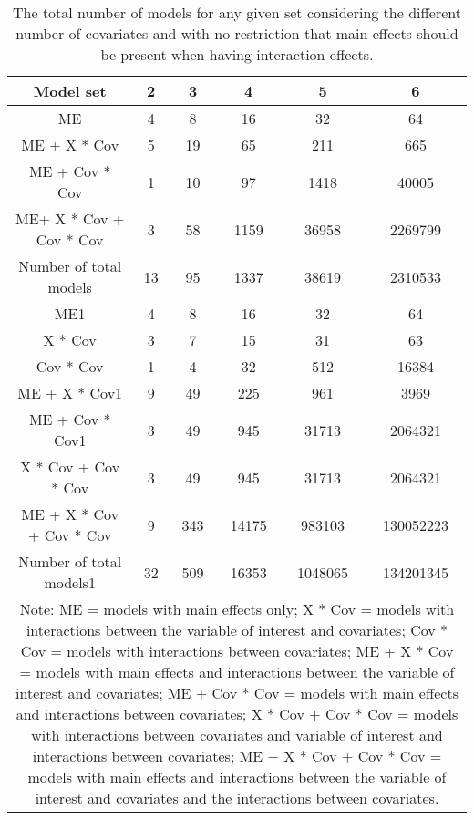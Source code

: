 \begin{table}[!h]
\centering
\caption{The total number of models for any given set considering the different number of covariates and with no restriction that main effects should be present when having interaction effects.} 
\begin{tabular}{cccccc}
  \hline
Model set & 2 & 3 & 4 & 5 & 6 \\ 
  \hline
ME & 4 & 8 & 16 & 32 & 64 \\ 
  ME + X * Cov & 5 & 19 & 65 & 211 & 665 \\ 
  ME + Cov * Cov & 1 & 10 & 97 & 1418 & 40005 \\ 
  ME+ X * Cov + Cov * Cov & 3 & 58 & 1159 & 36958 & 2269799 \\ 
  Number of total models & 13 & 95 & 1337 & 38619 & 2310533 \\ 
  ME1 & 4 & 8 & 16 & 32 & 64 \\ 
  X * Cov & 3 & 7 & 15 & 31 & 63 \\ 
  Cov * Cov & 1 & 4 & 32 & 512 & 16384 \\ 
  ME + X * Cov1 & 9 & 49 & 225 & 961 & 3969 \\ 
  ME + Cov * Cov1 & 3 & 49 & 945 & 31713 & 2064321 \\ 
  X * Cov + Cov * Cov & 3 & 49 & 945 & 31713 & 2064321 \\ 
  ME + X * Cov + Cov * Cov & 9 & 343 & 14175 & 983103 & 130052223 \\ 
  Number of total models1 & 32 & 509 & 16353 & 1048065 & 134201345 \\ 
   \hline 
\multicolumn{6}{p{13cm}}{\footnotesize{Note: ME = models with main effects only; X * Cov = models with interactions between the variable of interest and covariates; Cov * Cov = models with interactions between covariates;  ME + X * Cov = models with main effects and interactions between the variable of interest and covariates; ME + Cov * Cov = models with main effects and interactions between covariates; X * Cov + Cov * Cov = models with interactions between covariates and variable of interest and interactions between covariates; ME + X * Cov + Cov * Cov = models with main effects and interactions between the variable of interest and covariates and the interactions between covariates.}} 
 \hline
\end{tabular}
\end{table}
